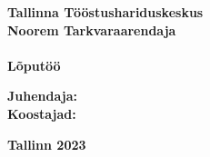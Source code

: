 \thispagestyle{empty}
\begin{center}
\textbf{Tallinna Tööstushariduskeskus}
\\
\textbf{Noorem Tarkvaraarendaja}
\\
\vfill
\Large
\textbf{\project}
\normalsize 
\\
\textbf{Lõputöö}
\vspace{5cm}
\\
\begin{flushright}
    \textbf{Juhendaja:} \supervisor 
    \\
    \textbf{Koostajad:} \authors
\end{flushright}
\vfill
\textbf{Tallinn 2023}
\end{center}
\newpage